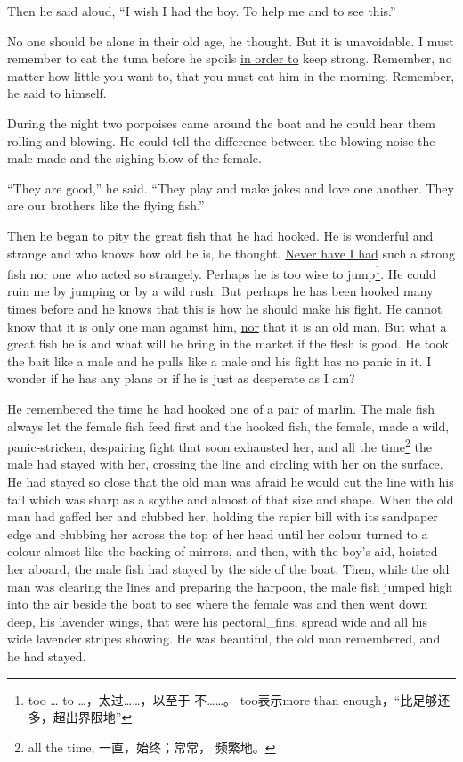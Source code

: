 \documentclass[fontset=ubuntu]{ctexrep}
\begin{document}
Then he said aloud, ``I wish I had the boy. To help me and to see this.''

No one should be alone in their old age, he thought. But it is
\gls{unavoidable}. I must remember to eat the tuna before he \glspl{spoil}
\uline{in order to} keep strong. Remember, no matter how little you want to,
that you must eat him in the morning. Remember, he said to himself.

During the night two \glspl{porpoise} came around the boat and he could hear
them \gls{rolling} and \gls{blowing}. He could tell the difference between
the blowing noise the \gls{male} made and the \gls{sighing} blow of the
\gls{female}.

``They are good,'' he said. ``They play and make jokes and love one another.
They are our brothers like the flying fish.''

Then he began to pity the great fish that he had hooked. He is wonderful and
strange and who knows how old he is, he thought. \uline{Never have I had}
such a strong fish nor one who \gls{acted} so strangely. Perhaps he is too
\gls{wise} to jump\footnote{too \ldots{} to \ldots{}，太过……，以至于
  不……。 too表示more than enough，“比足够还多，超出界限地”}. He could
\gls{ruin} me by jumping or by a wild rush. But perhaps he has been hooked
many times before and he knows that this is how he should make his fight. He
\uline{cannot} know that it is only one man against him, \uline{nor} that it
is an old man. But what a great fish he is and what will he bring in the
market if the flesh is good. He took the bait like a male and he pulls like
a male and his fight has no panic in it. I wonder if he has any plans or if
he is just as \gls{desperate} as I am?

He remembered the time he had hooked one of a pair of marlin. The male fish
always let the female fish feed first and the hooked fish, the female, made
a wild, panic-\gls{stricken}, \gls{despairing} fight that soon
\gls{exhausted} her, and all the time\footnote{all the time, 一直，始终；常常，
  频繁地。} the male had stayed with her, crossing the line and circling
with her on the surface. He had stayed so close that the old man was afraid
he would cut the line with his tail which was sharp as a \gls{scythe} and
almost of that size and shape. When the old man had gaffed her and clubbed
her, holding the \gls{rapier} \gls{bill} with its \gls{sandpaper} edge and
clubbing her across the top of her head until her colour turned to a colour
almost like the backing of mirrors, and then, with the boy's aid, hoisted
her aboard, the male fish had stayed by the side of the boat. Then, while
the old man was clearing the lines and preparing the harpoon, the male fish
jumped high into the air beside the boat to see where the female was and
then went down deep, his \gls{lavender} wings, that were his \glspl{pectoral_fin}, spread wide and all his wide lavender \glspl{stripe} showing. He was
beautiful, the old man remembered, and he had stayed.
\end{document}
